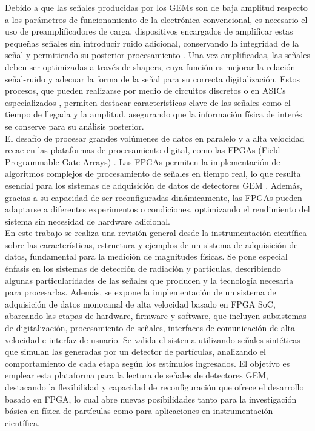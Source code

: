 \documentclass{article}
\begin{document}
\noindent Debido a que las señales producidas por los GEMs son de baja amplitud respecto a los parámetros de funcionamiento de la electrónica convencional, es necesario el uso de preamplificadores de carga, dispositivos encargados de amplificar estas pequeñas señales sin introducir ruido adicional, conservando la integridad de la señal y permitiendo su posterior procesamiento \cite{pezzotta2015design}. Una vez amplificadas, las señales deben ser optimizadas a través de shapers, cuya función es mejorar la relación señal-ruido y adecuar la forma de la señal para su correcta digitalización. Estos procesos, que pueden realizarse por medio de circuitos discretos o en ASICs especializados \cite{aspell2005vfat2}, permiten destacar características clave de las señales como el tiempo de llegada y la amplitud, asegurando que la información física de interés se conserve para su análisis posterior.\\

\noindent El desafío de procesar grandes volúmenes de datos en paralelo y a alta velocidad recae en las plataformas de procesamiento digital, como las FPGAs (Field Programmable Gate Arrays) \cite{choubey2006high}. Las FPGAs permiten la implementación de algoritmos complejos de procesamiento de señales en tiempo real, lo que resulta esencial para los sistemas de adquisición de datos de detectores GEM \cite{yu2005gem}. Además, gracias a su capacidad de ser reconfiguradas dinámicamente, las FPGAs pueden adaptarse a diferentes experimentos o condiciones, optimizando el rendimiento del sistema sin necesidad de hardware adicional.\\

\noindent En este trabajo se realiza una revisión general desde la instrumentación científica sobre las características, estructura y ejemplos de un sistema de adquisición de datos, fundamental para la medición de magnitudes físicas. Se pone especial énfasis en los sistemas de detección de radiación y partículas, describiendo algunas particularidades de las señales que producen y la tecnología necesaria para procesarlas. Además, se expone la implementación de un sistema de adquisición de datos monocanal de alta velocidad basado en FPGA SoC, abarcando las etapas de hardware, firmware y software, que incluyen subsistemas de digitalización, procesamiento de señales, interfaces de comunicación de alta velocidad e interfaz de usuario. Se valida el sistema utilizando señales sintéticas que simulan las generadas por un detector de partículas, analizando el comportamiento de cada etapa según los estímulos ingresados. El objetivo es emplear esta plataforma para la lectura de señales de detectores GEM, destacando la flexibilidad y capacidad de reconfiguración que ofrece el desarrollo basado en FPGA, lo cual abre nuevas posibilidades tanto para la investigación básica en física de partículas como para aplicaciones en instrumentación científica.
\end{document}
